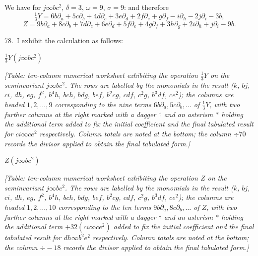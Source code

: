 \documentclass[11pt]{article}
\begin{document}
We have for $j \infty bc^2$, $\delta = 3$, $\omega = 9$, $\sigma = 9$: and therefore
\[
\tfrac{1}{3} Y = 6b\partial_a + 5c\partial_b + 4d\partial_c + 3e\partial_d + 2f\partial_e + g\partial_f - i\partial_h - 2j\partial_i - 3b,
\]
\[
Z = 9b\partial_a + 8c\partial_b + 7d\partial_c + 6e\partial_d + 5f\partial_e + 4g\partial_f + 3h\partial_g + 2i\partial_h + j\partial_i - 9b.
\]

\clearpage
78.\ I exhibit the calculation as follows:

\begin{center}
$\tfrac{1}{3} Y (j \infty bc^2)$
\end{center}

\textit{[Table: ten-column numerical worksheet exhibiting the operation $\tfrac{1}{3} Y$ on the seminvariant $j \infty bc^2$. The rows are labelled by the monomials in the result ($k$, $bj$, $ci$, $dh$, $eg$, $f^2$, $b^4h$, $bch$, $bdg$, $bef$, $b^2cg$, $cdf$, $c^2g$, $b^3df$, $ce^2$); the columns are headed $1, 2, \ldots, 9$ corresponding to the nine terms $6b\partial_a, 5c\partial_b, \ldots$ of $\tfrac{1}{3} Y$, with two further columns at the right marked with a dagger $\dagger$ and an asterism $*$ holding the additional term added to fix the initial coefficient and the final tabulated result for $ci \infty ce^2$ respectively. Column totals are noted at the bottom; the column $\div 70$ records the divisor applied to obtain the final tabulated form.]}

\medskip
\begin{center}
$Z (j \infty bc^2)$
\end{center}

\textit{[Table: ten-column numerical worksheet exhibiting the operation $Z$ on the seminvariant $j \infty bc^2$. The rows are labelled by the monomials in the result ($k$, $bj$, $ci$, $dh$, $eg$, $f^2$, $b^4h$, $bch$, $bdg$, $bef$, $b^2cg$, $cdf$, $c^2g$, $b^3df$, $ce^2$); the columns are headed $1, 2, \ldots, 10$ corresponding to the ten terms $9b\partial_a, 8c\partial_b, \ldots$ of $Z$, with two further columns at the right marked with a dagger $\dagger$ and an asterism $*$ holding the additional term $+ 32(ci \infty ce^2)$ added to fix the initial coefficient and the final tabulated result for $dh \infty b^2e^2$ respectively. Column totals are noted at the bottom; the column $\div -18$ records the divisor applied to obtain the final tabulated form.]}
\end{document}
